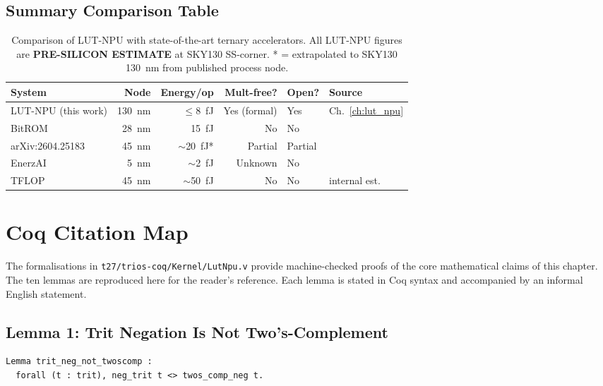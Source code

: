 \subsection{Summary Comparison Table}
\label{subsec:comparison_table}

\begin{table}[ht]
\centering
\caption{Comparison of LUT-NPU with state-of-the-art ternary accelerators.
         All LUT-NPU figures are \textbf{PRE-SILICON ESTIMATE} at SKY130 SS-corner.
         * = extrapolated to SKY130 130~nm from published process node.}
\label{tab:sota}
\begin{tabular}{lrrrll}
\hline
System & Node & Energy/op & Mult-free? & Open? & Source \\
\hline
LUT-NPU (this work) & 130~nm & $\leq 8$~fJ & Yes (formal) & Yes & Ch.~\ref{ch:lut_npu} \\
BitROM & 28~nm & 15~fJ & No & No & \cite{aspdac2026} \\
arXiv:2604.25183 & 45~nm & $\sim$20~fJ* & Partial & Partial & \cite{arxiv2604} \\
EnerzAI & 5~nm & $\sim$2~fJ & Unknown & No & \cite{enerzai} \\
TFLOP & 45~nm & $\sim$50~fJ & No & No & internal est. \\
\hline
\end{tabular}
\end{table}

\section{Coq Citation Map}
\label{sec:coq}

The formalisations in \texttt{t27/trios-coq/Kernel/LutNpu.v} provide
machine-checked proofs of the core mathematical claims of this chapter.
The ten lemmas are reproduced here for the reader's reference.
Each lemma is stated in Coq syntax and accompanied by an informal
English statement.

\subsection{Lemma 1: Trit Negation Is Not Two's-Complement}
\label{lem:neg_not_twoscomp}

\begin{verbatim}
Lemma trit_neg_not_twoscomp :
  forall (t : trit), neg_trit t <> twos_comp_neg t.
\end{verbatim}

